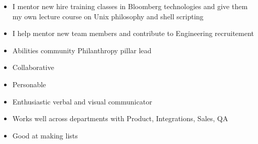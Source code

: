 %
%
%

\twocolumnsection
{
\vspace{0.25em}
\begin{itemize}
	\item I mentor new hire training classes in Bloomberg technologies and give them my own lecture course on Unix philosophy and shell scripting
    \item I help mentor new team members and contribute to  Engineering recruitement
    \item Abilities community Philanthropy pillar lead
\end{itemize}
}
{
\vspace{0.25em}
\begin{itemize}
	\item Collaborative
	\item Personable
    \item Enthusiastic verbal and visual communicator
    \item Works well across departments with Product, Integrations, Sales, QA
    \item Good at making lists
\end{itemize}
}


